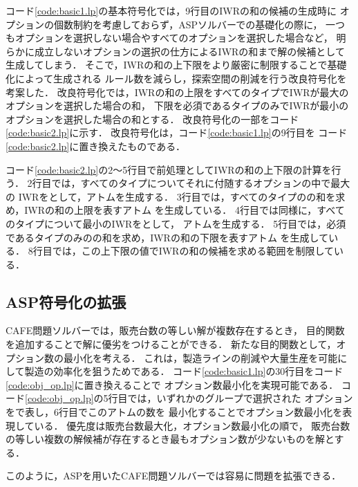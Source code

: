 コード\ref{code:basic1.lp}の基本符号化では，9行目のIWRの和の候補の生成時に
オプションの個数制約を考慮しておらず，ASPソルバーでの基礎化の際に，
一つもオプションを選択しない場合やすべてのオプションを選択した場合など，
明らかに成立しないオプションの選択の仕方によるIWRの和まで解の候補として生成してしまう．
そこで，IWRの和の上下限をより厳密に制限することで基礎化によって生成される
ルール数を減らし，探索空間の削減を行う改良符号化を考案した．
改良符号化では，IWRの和の上限をすべてのタイプでIWRが最大のオプションを選択した場合の和，
下限を必須であるタイプのみでIWRが最小のオプションを選択した場合の和とする．
改良符号化の一部をコード\ref{code:basic2.lp}に示す．
改良符号化は，コード\ref{code:basic1.lp}の9行目を
コード\ref{code:basic2.lp}に置き換えたものである．

コード\ref{code:basic2.lp}の2〜5行目で前処理としてIWRの和の上下限の計算を行う．
2行目では，すべてのタイプについてそれに付随するオプションの中で最大の
IWRをとして，アトムを生成する．
3行目では，すべてのタイプのの和を求め，IWRの和の上限を表すアトム
を生成している．
4行目では同様に，すべてのタイプについて最小のIWRをとして，
アトムを生成する．
5行目では，必須であるタイプのみのの和を求め，IWRの和の下限を表すアトム
を生成している．
8行目では，この上下限の値でIWRの和の候補を求める範囲を制限している．

\subsection{ASP符号化の拡張}
CAFE問題ソルバーでは，販売台数の等しい解が複数存在するとき，
目的関数を追加することで解に優劣をつけることができる．
新たな目的関数として，オプション数の最小化を考える．
これは，製造ラインの削減や大量生産を可能にして製造の効率化を狙うためである．
コード\ref{code:basic1.lp}の30行目をコード\ref{code:obj_op.lp}に置き換えることで
オプション数最小化を実現可能である．
コード\ref{code:obj_op.lp}の5行目では，いずれかのグループで選択された
オプションをで表し，6行目でこのアトムの数を
最小化することでオプション数最小化を表現している．
優先度は販売台数最大化，オプション数最小化の順で，
販売台数の等しい複数の解候補が存在するとき最もオプション数が少ないものを解とする．

このように，ASPを用いたCAFE問題ソルバーでは容易に問題を拡張できる．


 
